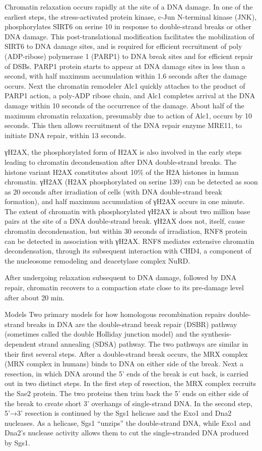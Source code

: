 Chromatin relaxation occurs rapidly at the site of a DNA damage. In one of the earliest steps, the stress-activated protein kinase, c-Jun N-terminal kinase (JNK), phosphorylates SIRT6 on serine 10 in response to double-strand breaks or other DNA damage. This post-translational modification facilitates the mobilization of SIRT6 to DNA damage sites, and is required for efficient recruitment of poly (ADP-ribose) polymerase 1 (PARP1) to DNA break sites and for efficient repair of DSBs. PARP1 protein starts to appear at DNA damage sites in less than a second, with half maximum accumulation within 1.6 seconds after the damage occurs. Next the chromatin remodeler Alc1 quickly attaches to the product of PARP1 action, a poly-ADP ribose chain, and Alc1 completes arrival at the DNA damage within 10 seconds of the occurrence of the damage. About half of the maximum chromatin relaxation, presumably due to action of Alc1, occurs by 10 seconds. This then allows recruitment of the DNA repair enzyme MRE11, to initiate DNA repair, within 13 seconds.

γH2AX, the phosphorylated form of H2AX is also involved in the early steps leading to chromatin decondensation after DNA double-strand breaks. The histone variant H2AX constitutes about 10\% of the H2A histones in human chromatin. γH2AX (H2AX phosphorylated on serine 139) can be detected as soon as 20 seconds after irradiation of cells (with DNA double-strand break formation), and half maximum accumulation of γH2AX occurs in one minute. The extent of chromatin with phosphorylated γH2AX is about two million base pairs at the site of a DNA double-strand break. γH2AX does not, itself, cause chromatin decondensation, but within 30 seconds of irradiation, RNF8 protein can be detected in association with γH2AX. RNF8 mediates extensive chromatin decondensation, through its subsequent interaction with CHD4, a component of the nucleosome remodeling and deacetylase complex NuRD.

After undergoing relaxation subsequent to DNA damage, followed by DNA repair, chromatin recovers to a compaction state close to its pre-damage level after about 20 min.

Models
Two primary models for how homologous recombination repairs double-strand breaks in DNA are the double-strand break repair (DSBR) pathway (sometimes called the double Holliday junction model) and the synthesis-dependent strand annealing (SDSA) pathway. The two pathways are similar in their first several steps. After a double-strand break occurs, the MRX complex (MRN complex in humans) binds to DNA on either side of the break. Next a resection, in which DNA around the 5' ends of the break is cut back, is carried out in two distinct steps. In the first step of resection, the MRX complex recruits the Sae2 protein. The two proteins then trim back the 5' ends on either side of the break to create short 3' overhangs of single-strand DNA. In the second step, 5'→3' resection is continued by the Sgs1 helicase and the Exo1 and Dna2 nucleases. As a helicase, Sgs1 ``unzips'' the double-strand DNA, while Exo1 and Dna2's nuclease activity allows them to cut the single-stranded DNA produced by Sgs1.


